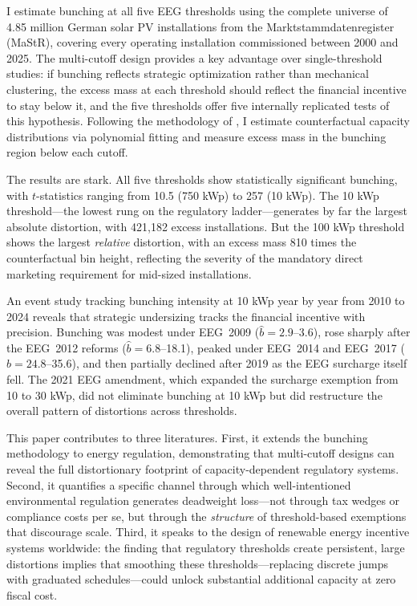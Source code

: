 \documentclass[12pt]{article}
\begin{document}
I estimate bunching at all five EEG thresholds using the complete universe of 4.85 million German solar PV installations from the Marktstammdatenregister (MaStR), covering every operating installation commissioned between 2000 and 2025. The multi-cutoff design provides a key advantage over single-threshold studies: if bunching reflects strategic optimization rather than mechanical clustering, the excess mass at each threshold should reflect the financial incentive to stay below it, and the five thresholds offer five internally replicated tests of this hypothesis. Following the methodology of \citet{Kleven2016}, I estimate counterfactual capacity distributions via polynomial fitting and measure excess mass in the bunching region below each cutoff.

The results are stark. All five thresholds show statistically significant bunching, with $t$-statistics ranging from 10.5 (750 kWp) to 257 (10 kWp). The 10 kWp threshold---the lowest rung on the regulatory ladder---generates by far the largest absolute distortion, with 421,182 excess installations. But the 100 kWp threshold shows the largest \textit{relative} distortion, with an excess mass 810 times the counterfactual bin height, reflecting the severity of the mandatory direct marketing requirement for mid-sized installations.

An event study tracking bunching intensity at 10 kWp year by year from 2010 to 2024 reveals that strategic undersizing tracks the financial incentive with precision. Bunching was modest under EEG~2009 ($\hat{b} = 2.9$--3.6), rose sharply after the EEG~2012 reforms ($\hat{b} = 6.8$--18.1), peaked under EEG~2014 and EEG~2017 ($\hat{b} = 24.8$--35.6), and then partially declined after 2019 as the EEG surcharge itself fell. The 2021 EEG amendment, which expanded the surcharge exemption from 10 to 30 kWp, did not eliminate bunching at 10 kWp but did restructure the overall pattern of distortions across thresholds.

This paper contributes to three literatures. First, it extends the bunching methodology \citep{Saez2010, KlevenWaseem2013, Kleven2016} to energy regulation, demonstrating that multi-cutoff designs can reveal the full distortionary footprint of capacity-dependent regulatory systems. Second, it quantifies a specific channel through which well-intentioned environmental regulation generates deadweight loss---not through tax wedges or compliance costs per se, but through the \textit{structure} of threshold-based exemptions that discourage scale. Third, it speaks to the design of renewable energy incentive systems worldwide: the finding that regulatory thresholds create persistent, large distortions implies that smoothing these thresholds---replacing discrete jumps with graduated schedules---could unlock substantial additional capacity at zero fiscal cost.
\end{document}
